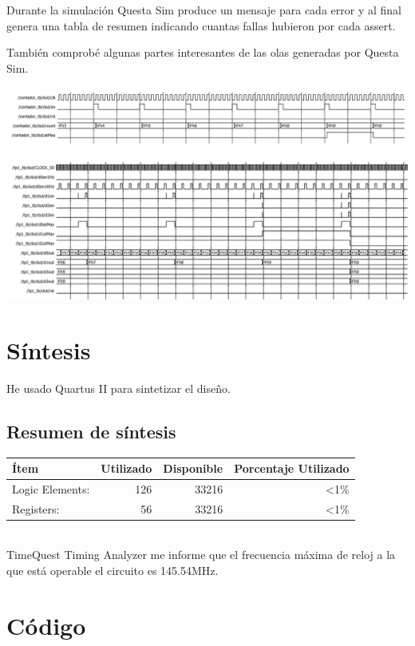 \documentclass[a4paper]{article}
\begin{document}
Durante la simulación Questa Sim produce un mensaje para cada error y al final genera una tabla de resumen indicando cuantas fallas hubieron por cada assert.

También comprobé algunas partes interesantes de las olas generadas por Questa Sim.

\includegraphics[width=15cm]{img/contador_waves.png}

\includegraphics[width=15cm]{img/tp1_waves.png}

\section{Síntesis}

He usado Quartus II para sintetizar el diseño.

\subsection{Resumen de síntesis}
\begin{tabular}{| l | r | r | r|}
\hline
\textbf{Ítem} & \textbf{Utilizado} & \textbf{Disponible} & \textbf{Porcentaje Utilizado} \\ \hline
Logic Elements: & 126 & 33216 & \textless 1\% \\
Registers: & 56 & 33216 & \textless 1\% \\ \hline
\end{tabular} \\

TimeQuest Timing Analyzer me informe que el frecuencia máxima de reloj a la que está operable el circuito es 145.54MHz.

\pagebreak
\section{Código}
\end{document}
